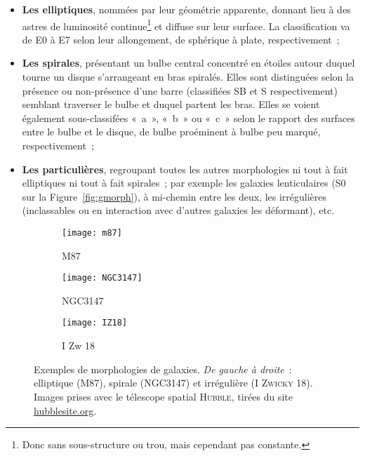 \documentclass[../main/main.tex]{subfiles}
\begin{document}
\begin{itemize}
    \item \textbf{Les elliptiques}, nommées par leur géométrie apparente,
        donnant lieu à des astres de luminosité continue\footnote{Donc sans
        sous-structure ou trou, mais cependant pas constante.} et diffuse sur
        leur surface. La classification va de E0 à E7 selon leur allongement, de
        sphérique à plate, respectivement~;
    \item \textbf{Les spirales}, présentant un bulbe central concentré en
        étoiles autour duquel tourne un disque s'arrangeant en bras spiralés.
        Elles sont distinguées selon la présence ou non-présence d'une barre
        (classifiées SB et S respectivement) semblant traverser le bulbe et
        duquel partent les bras. Elles se voient également sous-classifées
        «~a~», «~b~» ou «~c~» selon le rapport des surfaces entre le bulbe et le
        disque, de bulbe proéminent à bulbe peu marqué, respectivement~;
    \item \textbf{Les particulières}, regroupant toutes les autres morphologies
        ni tout à fait elliptiques ni tout à fait spirales~; par exemple les
        galaxies lenticulaires (S0 sur la Figure~\ref{fig:gmorph}), à mi-chemin
        entre les deux, les irrégulières (inclassables ou en interaction avec
        d'autres galaxies les déformant), etc.
\end{itemize}

\begin{figure}[t]
    \centering
    \begin{subfigure}[c]{.32\linewidth}
        \centering
        \texttt{[image: m87]}
        \captionsetup{justification=centering}
        \caption{M87}
        \label{fig:m87}
    \end{subfigure}
    \hfill
    \begin{subfigure}[c]{.32\linewidth}
        \centering
        \texttt{[image: NGC3147]}
        \captionsetup{justification=centering}
        \caption{NGC3147}
        \label{fig:ngc3147}
    \end{subfigure}
    \hfill
    \begin{subfigure}[c]{.32\linewidth}
        \centering
        \texttt{[image: IZ18]}
        \captionsetup{justification=centering}
        \caption{I Zw 18}
        \label{fig:iz18}
    \end{subfigure}
    \caption[Exemples de morphologies de galaxies]{Exemples de morphologies de
        galaxies. \textit{De gauche à droite}~: elliptique (M87), spirale
        (NGC3147) et irrégulière (I \textsc{Zwicky} 18). Images prises avec le
        télescope spatial \textsc{Hubble}, tirées
    du site \href{https://hubblesite.org}{hubblesite.org}.}
    \label{fig:gpict}
\end{figure}
\end{document}
